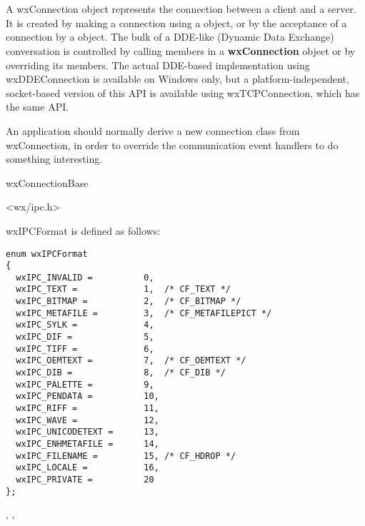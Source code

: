 \section{}\label{wxddeconnection}

A wxConnection object represents the connection between a client
and a server. It is created by making a connection using a\rtfsp
{} object, or by the acceptance of a
connection by a\rtfsp {} object. The
bulk of a DDE-like (Dynamic Data Exchange) conversation is
controlled by calling members in a {\bf wxConnection} object or
by overriding its members. The actual DDE-based implementation
using wxDDEConnection is available on Windows only, but a
platform-independent, socket-based version of this API is
available using wxTCPConnection, which has the same API.

An application should normally derive a new connection class from
wxConnection, in order to override the communication event
handlers to do something interesting.


wxConnectionBase\\


<wx/ipc.h>


wxIPCFormat is defined as follows:

\begin{verbatim}
enum wxIPCFormat
{
  wxIPC_INVALID =          0,
  wxIPC_TEXT =             1,  /* CF_TEXT */
  wxIPC_BITMAP =           2,  /* CF_BITMAP */
  wxIPC_METAFILE =         3,  /* CF_METAFILEPICT */
  wxIPC_SYLK =             4,
  wxIPC_DIF =              5,
  wxIPC_TIFF =             6,
  wxIPC_OEMTEXT =          7,  /* CF_OEMTEXT */
  wxIPC_DIB =              8,  /* CF_DIB */
  wxIPC_PALETTE =          9,
  wxIPC_PENDATA =          10,
  wxIPC_RIFF =             11,
  wxIPC_WAVE =             12,
  wxIPC_UNICODETEXT =      13,
  wxIPC_ENHMETAFILE =      14,
  wxIPC_FILENAME =         15, /* CF_HDROP */
  wxIPC_LOCALE =           16,
  wxIPC_PRIVATE =          20
};
\end{verbatim}


, ,


